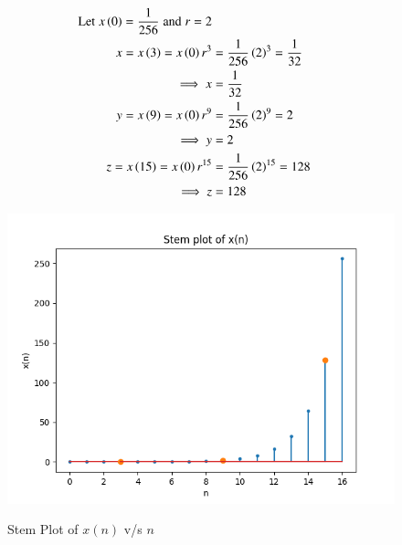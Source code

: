 \documentclass[journal,12pt,twocolumn]{IEEEtran}
\theoremstyle{remark}
\begin{document}
\begin{enumerate}
\begin{align}
    \text{Let}\;x\left(0\right) =\frac{1}{256}\;\text{and}\;r = 2\\      x=x\left(3\right)=x\left(0\right)r^3 &=\frac{1}{256}\left(2\right)^3=\frac{1}{32}\\
     \implies x&=\frac{1}{32} \\
     y=x\left(9\right)=x\left(0\right)r^{9} &=\frac{1}{256}\left(2\right)^{9}=2\\
     \implies y&=2 \\
     z=x\left(15\right)=x\left(0\right)r^{15} &=\frac{1}{256}\left(2\right)^{15}=128\\
    \implies z&=128
\end{align}
\newpage
\begin{figure}[h]
    \renewcommand\thefigure{1}
    \centering
    \caption{Stem Plot of $x(n)$ v/s $n$}
    \includegraphics[width=\columnwidth]{figs/A_1.png}
        \label{fig:1}
\end{figure}


\end{enumerate}
\end{document}
